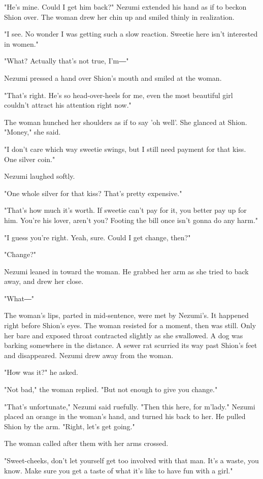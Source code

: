"He's mine. Could I get him back?" Nezumi extended his hand as if to
beckon Shion over. The woman drew her chin up and smiled thinly in
realization.

"I see. No wonder I was getting such a slow reaction. Sweetie here isn't
interested in women."

"What? Actually that's not true, I'm―"

Nezumi pressed a hand over Shion's mouth and smiled at the woman.

"That's right. He's so head-over-heels for me, even the most beautiful
girl couldn't attract his attention right now."

The woman hunched her shoulders as if to say 'oh well'. She glanced at
Shion. "Money," she said.

"I don't care which way sweetie swings, but I still need payment for
that kiss. One silver coin."

Nezumi laughed softly.

"One whole silver for that kiss? That's pretty expensive."

"That's how much it's worth. If sweetie can't pay for it, you better pay
up for him. You're his lover, aren't you? Footing the bill once isn't
gonna do any harm."

"I guess you're right. Yeah, sure. Could I get change, then?"

"Change?"

Nezumi leaned in toward the woman. He grabbed her arm as she tried to
back away, and drew her close.

"What―"

The woman's lips, parted in mid-sentence, were met by Nezumi's. It
happened right before Shion's eyes. The woman resisted for a moment,
then was still. Only her bare and exposed throat contracted slightly as
she swallowed. A dog was barking somewhere in the distance. A sewer rat
scurried its way past Shion's feet and disappeared. Nezumi drew away
from the woman.

"How was it?" he asked.

"Not bad," the woman replied. "But not enough to give you change."

"That's unfortunate," Nezumi said ruefully. "Then this here, for
m'lady." Nezumi placed an orange in the woman's hand, and turned his
back to her. He pulled Shion by the arm. "Right, let's get going."

The woman called after them with her arms crossed.

"Sweet-cheeks, don't let yourself get too involved with that man. It's a
waste, you know. Make sure you get a taste of what it's like to have fun
with a girl."

